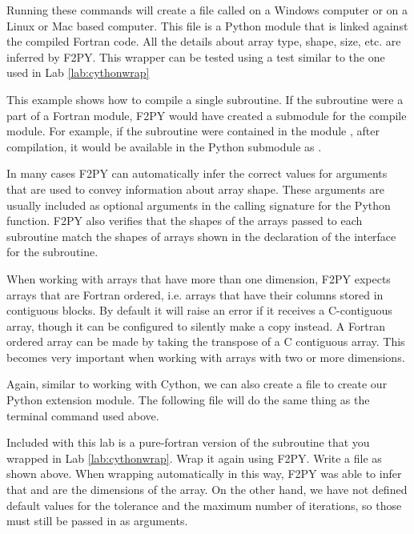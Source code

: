 Running these commands will create a file called  on a Windows computer or  on a Linux or Mac based computer.
This file is a Python module that is linked against the compiled Fortran code.
All the details about array type, shape, size, etc. are inferred by F2PY.
This wrapper can be tested using a test similar to the one used in Lab \ref{lab:cythonwrap}

\begin{info}
This example shows how to compile a single subroutine.
If the subroutine were a part of a Fortran module, F2PY would have created a submodule for the compile module.
For example, if the subroutine were contained in the module , after compilation, it would be available in the Python submodule  as .
\end{info}

\begin{info}
In many cases F2PY can automatically infer the correct values for arguments that are used to convey information about array shape.
These arguments are usually included as optional arguments in the calling signature for the Python function.
F2PY also verifies that the shapes of the arrays passed to each subroutine match the shapes of arrays shown in the declaration of the interface for the subroutine.
\end{info}

\begin{warn}
When working with arrays that have more than one dimension, F2PY expects arrays that are Fortran ordered, i.e. arrays that have their columns stored in contiguous blocks.
By default it will raise an error if it receives a C-contiguous array, though it can be configured to silently make a copy instead.
A Fortran ordered array can be made by taking the transpose of a C contiguous array.
This becomes very important when working with arrays with two or more dimensions.
\end{warn}

Again, similar to working with Cython, we can also create a  file to create our Python extension module.
The following  file will do the same thing as the terminal command used above.


\begin{problem}
Included with this lab is a pure-fortran version of the  subroutine that you wrapped in Lab \ref{lab:cythonwrap}.
Wrap it again using F2PY.
Write a  file as shown above.
When wrapping automatically in this way, F2PY was able to infer that  and  are the dimensions of the array.
On the other hand, we have not defined default values for the tolerance and the maximum number of iterations, so those must still be passed in as arguments.
\end{problem}

